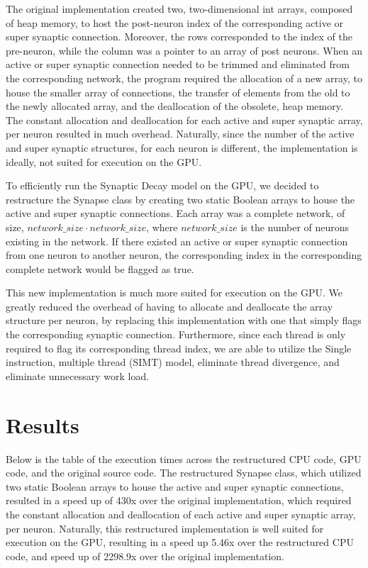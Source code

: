 \documentclass[a4paper]{article}
\begin{document}
The original implementation created two, two-dimensional int arrays, composed of heap memory, to host the post-neuron index of the corresponding active or super synaptic connection. Moreover, the rows corresponded to the index of the pre-neuron, while the column was a pointer to an array of post neurons. When an active or super synaptic connection needed to be trimmed and eliminated from the corresponding network, the program required the allocation of a new array, to house the smaller array of connections, the transfer of elements from the old to the newly allocated array, and the deallocation of the obsolete, heap memory. The constant allocation and deallocation for each active and super synaptic array, per neuron resulted in much overhead. Naturally, since the number of the active and super synaptic structures, for each neuron is different, the implementation is ideally, not suited for execution on the GPU. 

To efficiently run the Synaptic Decay model on the GPU, we decided to restructure the Synapse class by creating two static Boolean arrays to house the active and super synaptic connections. Each array was a complete network, of size, $network\_size\cdot network\_size$, where $network\_size$ is the number of neurons existing in the network. If there existed an active or super synaptic connection from one neuron to another neuron, the corresponding index in the corresponding complete network would be flagged as true. 

This new implementation is much more suited for execution on the GPU. We greatly reduced the overhead of having to allocate and deallocate the array structure per neuron, by replacing this implementation with one that simply flags the corresponding synaptic connection.  Furthermore, since each thread is only required to flag its corresponding thread index, we are able to utilize the Single instruction, multiple thread (SIMT) model, eliminate thread divergence, and eliminate unnecessary work load.


\section{Results}

Below is the table of the execution times across the restructured CPU code, GPU code, and the original source code. The restructured Synapse class, which utilized two static Boolean arrays to house the active and super synaptic connections, resulted in a speed up of 430x over the original implementation, which required the constant allocation and deallocation of each active and super synaptic array, per neuron. Naturally, this restructured implementation is well suited for execution on the GPU, resulting in a speed up 5.46x over the restructured CPU code, and  speed up of 2298.9x over the original implementation.
\end{document}
